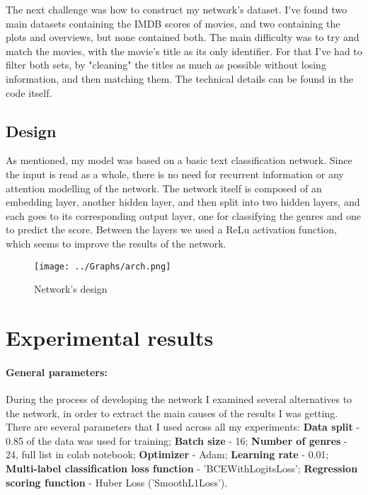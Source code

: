 \documentclass[11pt]{article}
\begin{document}
The next challenge was how to construct my network's dataset. 
I've found two main datasets containing the IMDB scores of movies, and two containing the plots and overviews, but none contained both.
The main difficulty was to try and match the movies, with the movie's title as its only identifier.
For that I've had to filter both sets, by "cleaning" the titles as much as possible without losing information, and then matching them.
The technical details can be found in the code itself.

\subsection{Design}\label{design}
As mentioned, my model was based on a basic text classification network. Since the input is read as a whole, there is no need for recurrent information or any attention modelling of the network. 
The network itself is composed of an embedding layer, another hidden layer, and then split into two hidden layers, and each goes to its corresponding output layer, one for classifying the genres and one to predict the score.
Between the layers we used a ReLu activation function, which seems to improve the results of the network.

\begin{figure}
  \centering
  \caption{Network's design}
  \texttt{[image: ../Graphs/arch.png]}
  \label{fig:design}
\end{figure}

\section{Experimental results}
\paragraph{General parameters:}
During the process of developing the network I examined several alternatives to the network, in order to extract the main causes of the results I was getting.
There are several parameters that I used across all my experiments: \textbf{Data split} - 0.85 of the data was used for training; \textbf{Batch size} - 16; 
\textbf{Number of genres} - 24, full list in colab notebook; \textbf{Optimizer} - Adam; \textbf{Learning rate} - 0.01; \textbf{Multi-label classification loss function} - 'BCEWithLogitsLoss'; 
\textbf{Regression scoring function} - Huber Loss ('SmoothL1Loss').
\end{document}
